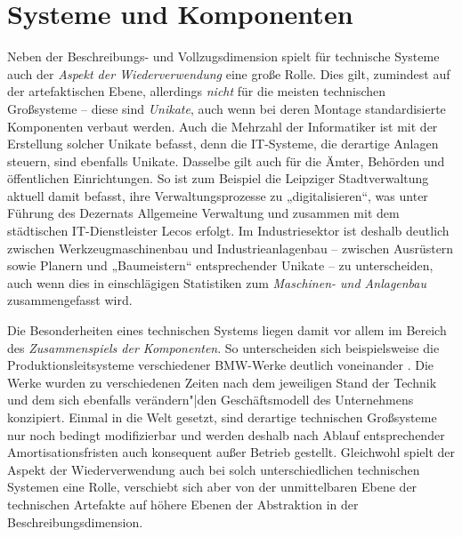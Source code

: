 \documentclass[12pt,a4paper]{article}
\begin{document}
\section{Systeme und Komponenten}

Neben der Beschreibungs- und Vollzugsdimension spielt für technische Systeme
auch der \emph{Aspekt der Wiederverwendung} eine große Rolle.  Dies gilt,
zumindest auf der artefaktischen Ebene, allerdings \emph{nicht} für die
meisten technischen Großsysteme -- diese sind \emph{Unikate}, auch wenn bei
deren Montage standardisierte Komponenten verbaut werden. Auch die Mehrzahl
der Informatiker ist mit der Erstellung solcher Unikate befasst, denn die
IT-Systeme, die derartige Anlagen steuern, sind ebenfalls Unikate.  Dasselbe
gilt auch für die Ämter, Behörden und öffentlichen Einrichtungen. So ist zum
Beispiel die Leipziger Stadtverwaltung aktuell damit befasst, ihre
Verwaltungsprozesse zu „digitalisieren“, was unter Führung des Dezernats
Allgemeine Verwaltung und zusammen mit dem städtischen IT-Dienstleister Lecos
erfolgt. Im Industriesektor ist deshalb deutlich zwischen Werkzeugmaschinenbau
und Industrieanlagenbau -- zwischen Ausrüstern sowie Planern und „Baumeistern“
entsprechender Unikate -- zu unterscheiden, auch wenn dies in einschlägigen
Statistiken \cite{VDMA2019} zum \emph{Maschinen- und Anlagenbau}
zusammengefasst wird.

Die Besonderheiten eines technischen Systems liegen damit vor allem im Bereich
des \emph{Zusammenspiels der Komponenten}. So unterscheiden sich
beispielsweise die Produktionsleitsysteme verschiedener BMW-Werke deutlich
voneinander \cite{Kropik2009}. Die Werke wurden zu verschiedenen Zeiten nach
dem jeweiligen Stand der Technik und dem sich ebenfalls verändern"|den
Geschäftsmodell des Unternehmens konzipiert. Einmal in die Welt gesetzt, sind
derartige technischen Großsysteme nur noch bedingt modifizierbar und werden
deshalb nach Ablauf entsprechender Amortisationsfristen auch konsequent außer
Betrieb gestellt. Gleichwohl spielt der Aspekt der Wiederverwendung auch bei
solch unterschiedlichen technischen Systemen eine Rolle, verschiebt sich aber
von der unmittelbaren Ebene der technischen Artefakte auf höhere Ebenen der
Abstraktion in der Beschreibungsdimension.
\end{document}

